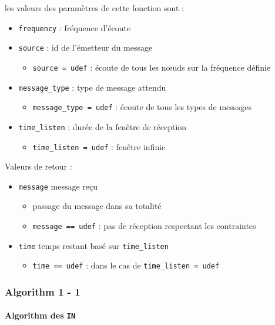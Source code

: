 \documentclass[conference]{IEEEtran}
\begin{document}
les valeurs des paramètres de cette fonction sont :
\begin{itemize}
  \item \texttt{frequency} : fréquence d'écoute
  \item \texttt{source} : id de l'émetteur du message
  \begin{itemize}
    \item \texttt{source = udef} : écoute de tous les n{\oe}uds sur la fréquence définie
  \end{itemize}
  \item \texttt{message\_type} : type de message attendu
  \begin{itemize}
    \item \texttt{message\_type = udef} : écoute de tous les types de messages
  \end{itemize}
  \item \texttt{time\_listen} : durée de la fenêtre de réception
  \begin{itemize}
    \item \texttt{time\_listen = udef} : fenêtre infinie
  \end{itemize}
\end{itemize}

Valeurs de retour :

\begin{itemize}
  \item \texttt{message} message reçu
  \begin{itemize}
    \item passage du message dans sa totalité
    \item \texttt{message == udef} : pas de réception respectant les contraintes
  \end{itemize}
  \item \texttt{time} temps restant basé sur \texttt{time\_listen}
  \begin{itemize}
    \item \texttt{time == udef} : dans le cas de \texttt{time\_listen = udef}
  \end{itemize}
\end{itemize}
\newpage
\subsubsection{Algorithm 1 - 1}

\paragraph{Algorithm des \texttt{IN}}
\end{document}

